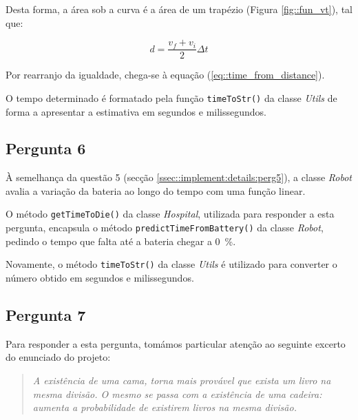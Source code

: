 Desta forma, a área sob a curva é a área de um trapézio (Figura \ref{fig::fun_vt}), tal que:

\begin{equation}
    d = \frac{v_f + v_i}{2}\Delta t
\end{equation}

Por rearranjo da igualdade, chega-se à equação (\ref{eq::time_from_distance}).

O tempo determinado é formatado pela função \texttt{timeToStr()} da classe \textit{Utils} de forma a apresentar a estimativa em segundos e milissegundos.



\subsection{Pergunta 6}
\label{ssec::implement:details:perg6}


À semelhança da questão 5 (secção \ref{ssec::implement:details:perg5}), a classe \textit{Robot} avalia a variação da bateria ao longo do tempo com uma função linear.

O método \texttt{getTimeToDie()} da classe \textit{Hospital}, utilizada para responder a esta pergunta, encapsula o método \texttt{predictTimeFromBattery()} da classe \textit{Robot}, pedindo o tempo que falta até a bateria chegar a \SI{0}{\percent}.

Novamente, o método \texttt{timeToStr()} da classe \textit{Utils} é utilizado para converter o número obtido em segundos e milissegundos.


\subsection{Pergunta 7}
\label{ssec::implement:details:perg7}


Para responder a esta pergunta, tomámos particular atenção ao seguinte excerto do enunciado do projeto:

\begin{quote}
    \itshape A existência de uma cama, torna mais provável que exista um livro na mesma divisão. O mesmo se passa com a existência de uma cadeira: aumenta a probabilidade de existirem livros na mesma divisão.
\end{quote}

